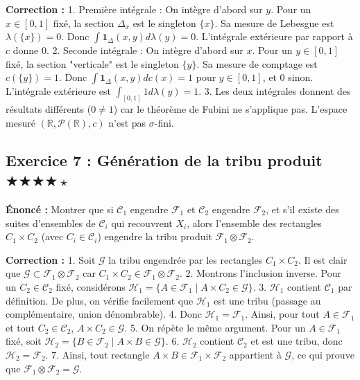 \documentclass[11pt,a4paper]{article}
\begin{document}
\textbf{Correction :}
1. Première intégrale : On intègre d'abord sur $y$. Pour un $x \in [0,1]$ fixé, la section $\Delta_x$ est le singleton $\{x\}$. Sa mesure de Lebesgue est $\lambda(\{x\}) = 0$.
   Donc $\int \mathbf{1}_\Delta(x,y) d\lambda(y) = 0$. L'intégrale extérieure par rapport à $c$ donne $0$.
2. Seconde intégrale : On intègre d'abord sur $x$. Pour un $y \in [0,1]$ fixé, la section "verticale" est le singleton $\{y\}$. Sa mesure de comptage est $c(\{y\}) = 1$.
   Donc $\int \mathbf{1}_\Delta(x,y) dc(x) = 1$ pour $y \in [0,1]$, et $0$ sinon. L'intégrale extérieure est $\int_{[0,1]} 1 d\lambda(y) = 1$.
3. Les deux intégrales donnent des résultats différents ($0 \neq 1$) car le théorème de Fubini ne s'applique pas. L'espace mesuré $(\mathbb{R}, \mathcal{P}(\mathbb{R}), c)$ n'est pas $\sigma$-fini.

\subsection*{Exercice 7 : Génération de la tribu produit \quad $\bigstar\bigstar\bigstar\bigstar\star$}

\textbf{Énoncé :}
Montrer que si $\mathcal{C}_1$ engendre $\mathcal{F}_1$ et $\mathcal{C}_2$ engendre $\mathcal{F}_2$, et s'il existe des suites d'ensembles de $\mathcal{C}_i$ qui recouvrent $X_i$, alors l'ensemble des rectangles $C_1 \times C_2$ (avec $C_i \in \mathcal{C}_i$) engendre la tribu produit $\mathcal{F}_1 \otimes \mathcal{F}_2$.

\textbf{Correction :}
1. Soit $\mathcal{G}$ la tribu engendrée par les rectangles $C_1 \times C_2$. Il est clair que $\mathcal{G} \subset \mathcal{F}_1 \otimes \mathcal{F}_2$ car $C_1 \times C_2 \in \mathcal{F}_1 \otimes \mathcal{F}_2$.
2. Montrons l'inclusion inverse. Pour un $C_2 \in \mathcal{C}_2$ fixé, considérons $\mathcal{H}_1 = \{ A \in \mathcal{F}_1 \mid A \times C_2 \in \mathcal{G} \}$.
3. $\mathcal{H}_1$ contient $\mathcal{C}_1$ par définition. De plus, on vérifie facilement que $\mathcal{H}_1$ est une tribu (passage au complémentaire, union dénombrable).
4. Donc $\mathcal{H}_1 = \mathcal{F}_1$. Ainsi, pour tout $A \in \mathcal{F}_1$ et tout $C_2 \in \mathcal{C}_2$, $A \times C_2 \in \mathcal{G}$.
5. On répète le même argument. Pour un $A \in \mathcal{F}_1$ fixé, soit $\mathcal{H}_2 = \{ B \in \mathcal{F}_2 \mid A \times B \in \mathcal{G} \}$.
6. $\mathcal{H}_2$ contient $\mathcal{C}_2$ et est une tribu, donc $\mathcal{H}_2 = \mathcal{F}_2$.
7. Ainsi, tout rectangle $A \times B \in \mathcal{F}_1 \times \mathcal{F}_2$ appartient à $\mathcal{G}$, ce qui prouve que $\mathcal{F}_1 \otimes \mathcal{F}_2 = \mathcal{G}$.
\end{document}
